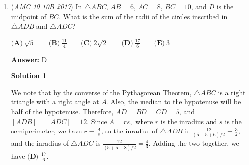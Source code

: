 \begin{enumerate}
Consider how to construct any divisor $D$ of $21!$. First by Legendre's theorem for the divisors of a factorial (see here: \href{https://artofproblemsolving.com/wiki/index.php?title=Legendre\%27s\_Formula}{Legendre's Formula}), we have that there are a total of 18 factors of 2 in the number. $D$ can take up either 0, 1, 2, 3,..., or all 18 factors of 2, for a total of 19 possible cases. In order for $D$ to be odd, however, it must have 0 factors of 2, meaning that there is a probability of 1 case/19 cases = $\boxed{\textbf{(B)} \frac 1{19}}$




\textbf{Solution 4}

We can find the prime factorization of $21!$. We do this by finding the prime factorization of each of 21, 20, ..., 2, and 1 and multiplying them together. This gives us $2^{18} \cdot 3^{9} \cdot 5^{4} \cdot 7^{3} \cdot 11 \cdot 13 \cdot 17 \cdot 19$. To find the number of odd divisors, we pretend as if the $2^{18}$ doesn't exist and count the other divisors: $10 \cdot 5 \cdot 4 \cdot 2 \cdot 2 \cdot 2 \cdot 2$. The total number of divisors are $19 \cdot 10 \cdot 5 \cdot 4 \cdot 2 \cdot 2 \cdot 2 \cdot 2$. Dividing gives $\boxed{\textbf{(B)} ~\frac{1}{19}}$.

 


	\item (\textit{AMC 10 10B 2017}) In $\triangle ABC$, $AB=6$, $AC=8$, $BC=10$, and $D$ is the midpoint of $\overline{BC}$. What is the sum of the radii of the circles inscribed in $\triangle ADB$ and $\triangle ADC$?


 $\textbf{(A)}\ \sqrt{5}\qquad\textbf{(B)}\ \frac{11}{4}\qquad\textbf{(C)}\ 2\sqrt{2}\qquad\textbf{(D)}\ \frac{17}{6}\qquad\textbf{(E)}\ 3$

 \textbf{Answer: }D



\textbf{Solution 1}

We note that by the converse of the Pythagorean Theorem, $\triangle ABC$ is a right triangle with a right angle at $A$. Also, the median to the hypotenuse will be half of the hypotenuse. Therefore, $AD = BD = CD = 5$, and $[ADB] = [ADC] = 12$. Since $A = rs,$ where $r$ is the inradius and $s$ is the semiperimeter, we have $r = \frac As$, so the inradius of $\triangle ADB$ is $\frac{12}{(5+5+6)/2} = \frac 32$, and the inradius of $\triangle ADC$  is $\frac{12}{(5+5+8)/2} = \frac 43$. Adding the two together, we have $\boxed{\textbf{(D) } \frac{17}6}$.

 




\end{enumerate}
